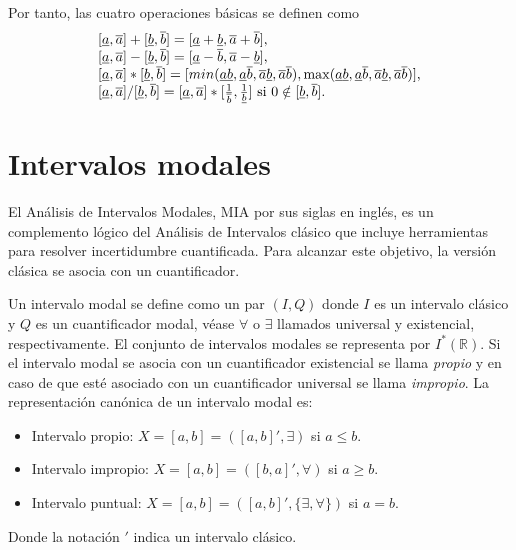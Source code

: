 Por tanto, las cuatro operaciones básicas se definen como
\begin{equation}
\begin{tabular}{l}
$[\underline{a},\overline{a}] + [\underline{b},\overline{b}] = [\underline{a} + \underline{b},\overline{a} + \overline{b}]$, \\
$[\underline{a},\overline{a}] - [\underline{b},\overline{b}] = [\underline{a} - \overline{b},\overline{a} - \underline{b}]$, \\
$[\underline{a},\overline{a}] * [\underline{b},\overline{b}] = [min(\underline{a}\underline{b},\underline{a}\overline{b},\overline{a}\underline{b},\overline{a}\overline{b}), \max(\underline{a}\underline{b},\underline{a}\overline{b},\overline{a}\underline{b},\overline{a}\overline{b})]$, \\
$[\underline{a},\overline{a}] / [\underline{b},\overline{b}] = [\underline{a},\overline{a}]*[\frac{1}{\overline{b}},\frac{1}{\underline{b}}] \text{ si } 0 \notin [\underline{b},\overline{b}]$.
\end{tabular}
\nonumber
\end{equation}

\section{Intervalos modales}

El Análisis de Intervalos Modales, MIA por sus siglas en inglés, es un complemento lógico del Análisis de Intervalos clásico que incluye herramientas para resolver incertidumbre cuantificada. Para alcanzar este objetivo, la versión clásica se asocia con un cuantificador.

Un intervalo modal se define como un par $(I,Q)$ donde $I$ es un intervalo clásico y $Q$ es un cuantificador modal, véase $\forall$ o $\exists$ llamados universal y existencial, respectivamente. El conjunto de intervalos modales se representa por $I^*(\mathbb{R})$. Si el intervalo modal se asocia con un cuantificador existencial se llama{ \em propio} y en caso de que esté asociado con un cuantificador universal se llama{ \em impropio}. La representación canónica de un intervalo modal es:
\begin{itemize}
	\item Intervalo propio: $X = [a,b] = ([a,b]',\exists)$ si $a \leq b$.
	\item Intervalo impropio: $X = [a,b] = ([b,a]',\forall)$ si $a \geq b$.
	\item Intervalo puntual: $X = [a,b] = ([a,b]',\{ \exists, \forall \})$ si $a = b$.
\end{itemize}
Donde la notación $'$ indica un intervalo clásico.

